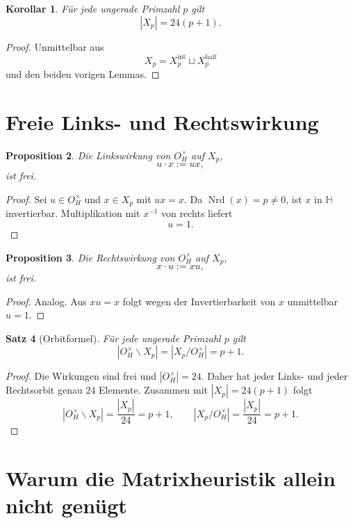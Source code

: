 \documentclass[12pt,a4paper]{article}
\newtheorem{satz}{Satz}[section]
\newtheorem{proposition}[satz]{Proposition}
\newtheorem{korollar}[satz]{Korollar}
\theoremstyle{definition}
\newcommand{\OH}{O_H}
\newcommand{\HH}{\mathbb{H}}
\newcommand{\Nrd}{\operatorname{Nrd}}
\begin{document}
	\begin{korollar}
		Für jede ungerade Primzahl \(p\) gilt
		\[
		|X_p|=24(p+1).
		\]
	\end{korollar}
	
	\begin{proof}
		Unmittelbar aus
		\[
		X_p=X_p^{\mathrm{int}}\sqcup X_p^{\mathrm{half}}
		\]
		und den beiden vorigen Lemmas.
	\end{proof}
	
	\section{Freie Links- und Rechtswirkung}
	
	\begin{proposition}
		Die Linkswirkung von \(\OH^\times\) auf \(X_p\),
		\[
		u\cdot x:=ux,
		\]
		ist frei.
	\end{proposition}
	
	\begin{proof}
		Sei \(u\in \OH^\times\) und \(x\in X_p\) mit \(ux=x\). Da \(\Nrd(x)=p\neq 0\), ist \(x\) in \(\HH\) invertierbar. Multiplikation mit \(x^{-1}\) von rechts liefert
		\[
		u=1.
		\]
	\end{proof}
	
	\begin{proposition}
		Die Rechtswirkung von \(\OH^\times\) auf \(X_p\),
		\[
		x\cdot u:=xu,
		\]
		ist frei.
	\end{proposition}
	
	\begin{proof}
		Analog. Aus \(xu=x\) folgt wegen der Invertierbarkeit von \(x\) unmittelbar \(u=1\).
	\end{proof}
	
	\begin{satz}[Orbitformel]
		Für jede ungerade Primzahl \(p\) gilt
		\[
		|\OH^\times\backslash X_p|
		=
		|X_p/\OH^\times|
		=
		p+1.
		\]
	\end{satz}
	
	\begin{proof}
		Die Wirkungen sind frei und \(|\OH^\times|=24\). Daher hat jeder Links- und jeder Rechtsorbit genau \(24\) Elemente. Zusammen mit \(|X_p|=24(p+1)\) folgt
		\[
		|\OH^\times\backslash X_p|=\frac{|X_p|}{24}=p+1,
		\qquad
		|X_p/\OH^\times|=\frac{|X_p|}{24}=p+1.
		\]
	\end{proof}
	
	\section{Warum die Matrixheuristik allein nicht genügt}
	
\end{document}
